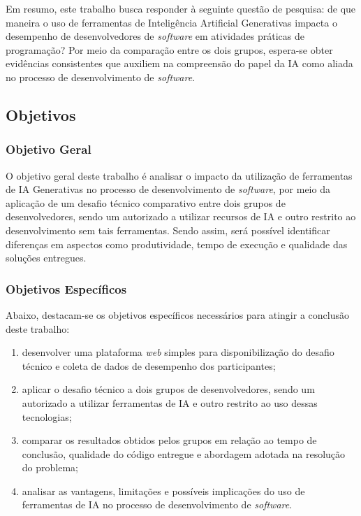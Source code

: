 \documentclass[english,brazilian]{UNISINOSartigo} %
\begin{document}
Em resumo, este trabalho busca responder à seguinte questão de pesquisa: de que maneira o uso de ferramentas de Inteligência Artificial Generativas impacta o desempenho de desenvolvedores de \textit{software} em atividades práticas de programação? Por meio da comparação entre os dois grupos, espera-se obter evidências consistentes que auxiliem na compreensão do papel da IA como aliada no processo de desenvolvimento de \textit{software}.

\subsection{Objetivos}

\subsubsection{Objetivo Geral}

O objetivo geral deste trabalho é analisar o impacto da utilização de ferramentas de IA Generativas no processo de desenvolvimento de \textit{software}, por meio da aplicação de um desafio técnico comparativo entre dois grupos de desenvolvedores, sendo um autorizado a utilizar recursos de IA e outro restrito ao desenvolvimento sem tais ferramentas. Sendo assim, será possível identificar diferenças em aspectos como produtividade, tempo de execução e qualidade das soluções entregues.

\subsubsection{Objetivos Específicos}

Abaixo, destacam-se os objetivos específicos necessários para atingir a conclusão deste trabalho:
\begin{enumerate}[label=\alph*), leftmargin=1.2cm, itemsep=0.1em, topsep=0.1em]
    \item desenvolver uma plataforma \textit{web} simples para disponibilização do desafio técnico e coleta de dados de desempenho dos participantes;
    \item aplicar o desafio técnico a dois grupos de desenvolvedores, sendo um autorizado a utilizar ferramentas de IA e outro restrito ao uso dessas tecnologias;
    \item comparar os resultados obtidos pelos grupos em relação ao tempo de conclusão, qualidade do código entregue e abordagem adotada na resolução do problema;
    \item analisar as vantagens, limitações e possíveis implicações do uso de ferramentas de IA no processo de desenvolvimento de \textit{software}.
\end{enumerate}
\end{document}
